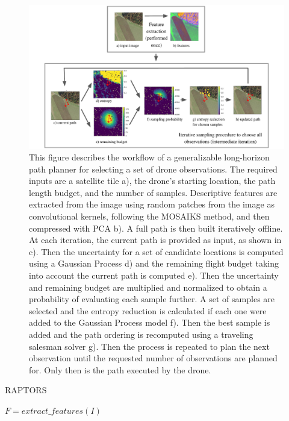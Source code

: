 \begin{figure}
    \centering
    \includegraphics[width=\textwidth, clip, trim={1.5cm, 0, 1.5cm, 0}]{figs/methods/IPP/RAPTORS_concept_figure.pdf}
    \caption{This figure describes the workflow of a generalizable long-horizon path planner for selecting a set of drone observations. The required inputs are a satellite tile a), the drone's starting location, the path length budget, and the number of samples. Descriptive features are extracted from the image using random patches from the image as convolutional kernels, following the MOSAIKS method, and then compressed with PCA b). A full path is then built iteratively offline. At each iteration, the current path is provided as input, as shown in c). Then the uncertainty for a set of candidate locations is computed using a Gaussian Process d) and the remaining flight budget taking into account the current path is computed e). Then the uncertainty and remaining budget are multiplied and normalized to obtain a probability of evaluating each sample further. A set of samples are selected and the entropy reduction is calculated if each one were added to the Gaussian Process model f). Then the best sample is added and the path ordering is recomputed using a traveling salesman solver g). Then the process is repeated to plan the next observation until the requested number of observations are planned for. Only then is the path executed by the drone.
}
    \label{fig:methods:IPP_raptors_overview}
\end{figure}

\begin{algorithm}
\caption{RAPTORS}\label{alg:methods:RAPTORS}
\begin{algorithmic}
\State $F = extract\_features(I)$
\end{algorithmic}
\end{algorithm}

